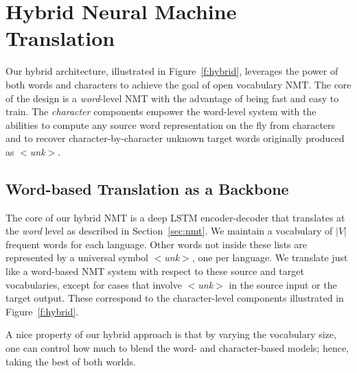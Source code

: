 \documentclass[11pt]{article}
\newcommand{\imgExt}{eps}
\newcommand{\unk}{$<${\it unk}$>$}
\begin{document}
\section{Hybrid Neural Machine Translation}
\label{sec:hybrid}
Our hybrid architecture, illustrated in Figure~\ref{f:hybrid}, leverages the power of both words
and characters to achieve the goal of open vocabulary NMT. The core of the
design is a {\it word}-level NMT with the advantage of being fast and easy to
train.
The {\it character} components empower the 
word-level system with the abilities to compute any source word representation on the fly from 
characters and to recover character-by-character unknown target words
originally produced as \unk{}.

\subsection{Word-based Translation as a Backbone}
\label{subsec:hybrid_word}

The core of our hybrid NMT is a deep LSTM encoder-decoder that translates at
the {\it word} level as described in Section~\ref{sec:nmt}. We maintain a
vocabulary of $|V|$ frequent words for each language. Other words not inside these
lists are represented by a universal symbol \unk{}, one per language.
We translate just like a word-based NMT system with respect to these source and
target vocabularies, except for cases that involve \unk{} in the source input or 
the target output. These correspond to the character-level components 
illustrated in Figure~\ref{f:hybrid}.

A nice property of our hybrid approach is that by varying the vocabulary size,
 one can control how much to blend the
word- and character-based models; hence, taking the best of both
worlds. 
\end{document}
